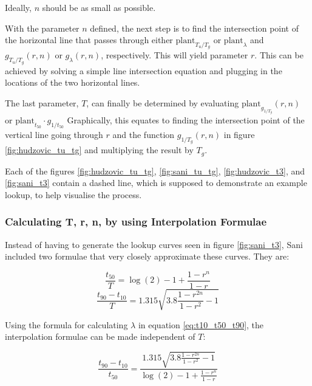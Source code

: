 Ideally, $n$ should be as small as possible.

With the parameter $n$ defined, the next step is to find the  intersection point
of the horizontal line that passes through either  $\textrm{plant}_{T_u/T_g}$ or
$\textrm{plant}_{\lambda}$   and   $g_{T_u/T_g}(r,n)$   or   $g_{\lambda}(r,n)$,
respectively.  This will yield parameter $r$. This can be achieved by solving  a
simple  line  intersection  equation  and plugging in the locations of  the  two
horizontal lines.

The   last   parameter,   $T$,   can  finally  be   determined   by   evaluating
$\textrm{plant}_{g_{1/T_g}}(r,    n)$    or    $\textrm{plant}_{t_{50}}    \cdot
g_{1/t_{50}}$ Graphically, this equates to finding the intersection point of the
vertical line going through $r$ and the function  $g_{1/T_g}(r,  n)$  in  figure
\ref{fig:hudzovic_tu_tg} and multiplying the result by $T_g$.

Each    of   the   figures    \ref{fig:hudzovic_tu_tg},    \ref{fig:sani_tu_tg},
\ref{fig:hudzovic_t3}, and \ref{fig:sani_t3}  contain  a  dashed  line, which is
supposed to demonstrate  an  example  lookup,  to  help  visualise  the process.


\subsubsection*{Calculating T, r, n, by using Interpolation Formulae}

Instead   of   having   to   generate  the  lookup   curves   seen   in   figure
\ref{fig:sani_t3},  Sani\cite{ref:sani} included two formulae that very  closely
approximate these curves. They are:

\begin{equation}
    \frac{t_{50}}{T} = \log(2)-1+\frac{1-r^{n}}{1-r}
    \label{eq:T_t50}
\end{equation}
\begin{equation}
    \frac{t_{90}-t_{10}}{T} = 1.315 \sqrt{3.8\frac{1-r^{2n}}{1-r^2} - 1}
\end{equation}

Using  the  formula for calculating $\lambda$ in equation  \ref{eq:t10_t50_t90},
the interpolation formulae can be made independent of $T$:

\begin{equation}
    \frac{t_{90}-t_{10}}{t_{50}} = \frac{1.315 \sqrt{3.8\frac{1-r^{2n}}{1-r^2} - 1}}{\log(2)-1+\frac{1-r^{n}}{1-r}}
    \label{eq:sani_interpolation}
\end{equation}

